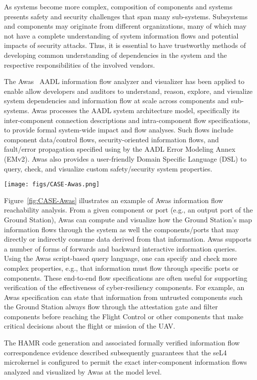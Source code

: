 
As systems become more complex, composition of components and 
systems presents safety and security challenges that span
many sub-systems.  Subsystems and components may originate from
different organizations, many of which may not have a complete
understanding of system information flows and potential impacts of
security attacks.  Thus, it is essential to have trustworthy methods
of developing common understanding of dependencies in the system and
the respective responsibilities of the involved vendors.  

The Awas~\cite{awas} AADL information flow analyzer and visualizer has been 
applied to enable allow developers and auditors to understand, reason,
explore, and visualize system dependencies and information flow at
scale across components and sub-systems.  Awas processes the AADL
system architecture model, specifically its inter-component connection
descriptions and intra-component flow specifications, to provide
formal system-wide impact and flow analyses.
Such flows include component data/control flows,
security-oriented information flows, and fault/error propagation
specified using by the AADL Error Modeling Annex (EMv2).
Awas also provides a user-friendly Domain Specific Language (DSL) to 
query, check, and visualize custom safety/security system properties.

\begin{figure*}[h]
	\centering
	\texttt{[image: figs/CASE-Awas.png]}
	\caption{Awas Information Flow Analysis.  EVEN AT THIS SIZE I THINK THIS IS WAY TO SMALL} 
	\label{fig:CASE-Awas} 
\end{figure*}

Figure~\ref{fig:CASE-Awas} illustrates an example of Awas information flow reachability analysis.
From a given component or port (e.g., an output port of the Ground Station),
Awas can compute and visualize how the Ground Station’s map information flows through the system
as well the components/ports that may directly or indirectly consume data derived from that information.
Awas supports a number of forms of forwards and backward interactive information queries.
Using the Awas script-based query language, one can specify and check more complex properties, e.g.,
that information must flow through specific ports or components.
These end-to-end flow specifications are often useful for supporting verification of the
effectiveness of cyber-resiliency components.   For example, an Awas specification can state that
information from untrusted components such the Ground Station always flow through the
attestation gate and filter components before reaching the Flight Control or other components
that make critical decisions about the flight or mission of the UAV.

The HAMR code generation and associated formally verified information
flow correspondence evidence described subsequently
guarantees that the seL4 microkernel is configured to permit the exact
inter-component information flows analyzed and visualized by Awas at
the model level.